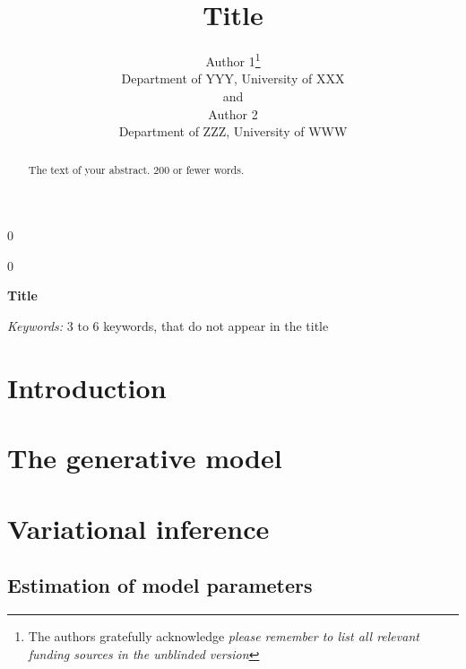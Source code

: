 \documentclass[12pt]{article}
\newcommand{\blind}{0}
\begin{document}
%

\def\spacingset#1{\renewcommand{\baselinestretch}%
{#1}\small\normalsize} \spacingset{1}



\blind
{
  \title{\bf Title}
  \author{Author 1\thanks{
    The authors gratefully acknowledge \textit{please remember to list all relevant funding sources in the unblinded version}}\hspace{.2cm}\\
    Department of YYY, University of XXX\\
    and \\
    Author 2 \\
    Department of ZZZ, University of WWW}
  \maketitle
} \fi

\blind
{
  \bigskip
  \bigskip
  \bigskip
  \begin{center}
    {\LARGE\bf Title}
\end{center}
  \medskip
} \fi

\bigskip
\begin{abstract}
The text of your abstract. 200 or fewer words.
\end{abstract}

\noindent%
{\it Keywords:}  3 to 6 keywords, that do not appear in the title
\vfill

\newpage
\spacingset{1.45} %
\section{Introduction}
\label{sec:intro}

\section{The generative model}
\label{sec:gen_model}


\section{Variational inference}
\label{sec:var_inference}


\subsection{Estimation of model parameters}
\label{sec:model_params}

\end{document}
